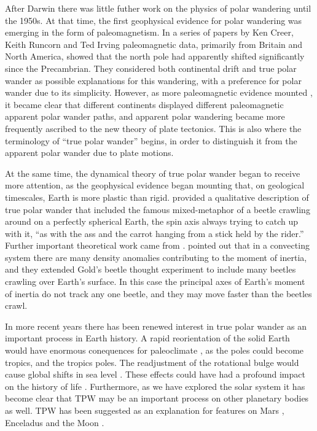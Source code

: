 After Darwin there was little futher work on the physics of polar wandering
until the 1950s. At that time, the first geophysical evidence for polar wandering
was emerging in the form of paleomagnetism.
In a series of papers by Ken Creer, Keith Runcorn and Ted Irving 
\citep{creer1954direction, runcorn1955rock, creer1957geophysical} paleomagnetic data,
primarily from Britain and North America, showed that the north pole had apparently shifted significantly
since the Precambrian. They considered both continental drift and true polar wander
as possible explanations for this wandering, with a preference for polar wander due to its simplicity.
However, as more paleomagnetic evidence mounted \citep[e.g.][]{irving1958polar}, it became clear
that different continents displayed different paleomagnetic apparent polar wander paths,
and apparent polar wandering became more frequently ascribed to the new theory of plate tectonics.
This is also where the terminology of ``true polar wander'' begins, in order to distinguish
it from the apparent polar wander due to plate motions.

At the same time, the dynamical theory of true polar wander began to receive more attention,
as the geophysical evidence began mounting that, on geological timescales, Earth is more
plastic than rigid. \citet{gold1955instability} provided a qualitative description of
true polar wander that included the famous mixed-metaphor of a beetle crawling
around on a perfectly spherical Earth, the spin axis always trying to catch up with it,
``as with the ass and the carrot hanging from a stick held by the rider.''
Further important theoretical work came from \citet{munk1960rotation}.
\citet{goldreich1969some} pointed out that in a convecting system there
are many density anomalies contributing to the moment of inertia,
and they extended Gold's beetle thought experiment to include many beetles crawling over Earth's surface. 
In this case the principal axes of Earth's moment of inertia do not track any one beetle,
and they may move faster than the beetles crawl.

In more recent years there has been renewed interest in true polar wander as an important process in Earth history.
A rapid reorientation of the solid Earth would have enormous conequences for paleoclimate \citep{kirschvink1997evidence},
as the poles could become tropics, and the tropics poles. The readjustment of the rotational
bulge would cause global shifts in sea level \citep{mound1999sea}.
These effects could have had a profound impact on the history of life \citep[e.g][]{kirschvink2003methane}.
Furthermore, as we have explored the solar system it has become clear that TPW
may be an important process on other planetary bodies as well.
TPW has been suggested as an explanation for features on Mars \citep{perron2007evidence},
Enceladus \citep{nimmo2006diapir} and the Moon \citep{garrick2014tidal}.


